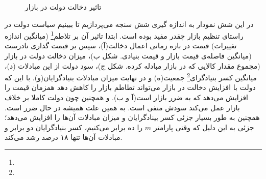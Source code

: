 \documentclass[13pt,onecolumn,a4paper]{article}
\begin{document}
\begin{figure}[H]
	\medskip
	\hfil
	\caption{تاثیر دخالت دولت در بازار}
	\label{fig:myfigure}
\end{figure}
در این شش نمودار به اندازه گیری شش سنجه می‌پردازیم تا ببینیم سیاست دولت در راستای تنظیم بازار چقدر مفید بوده است. ابتدا تاثیر آن بر تلاطم\footnote{} (میانگین اندازه تغییرات) قیمت در بازه زمانی اعمال دخالت(آ)، سپس بر قیمت گذاری نادرست (میانگین فاصله‌ی قیمت بازار و قیمت بنیادی. شکل ب)، میزان دخالت دولت در بازار (مجموع مقدار کالایی که در بازار مبادله کرده. شکل ج)، سود دولت از این مبادلات (د)، میانگین کسر بنیادگرای\footnote{} جمعیت(ه) و در نهایت میزان مبادلات بنیادگرایان(و). با این که دولت با افزایش دخالت در بازار می‌تواند تطاطم بازار را کاهش دهد همزمان قیمت را افزایش می‌دهد که به ضرر بازار است(آ و ب). و همچنین چون دولت کاملا بر خلاف بازار عمل می‌کند سودش منفی است. به همین علت همیشه در حال ضرر است. همچنین به طور بسیار جزئی کسر بینادگرایان و میزان مبادلات آن‌ها را افزایش می‌د‌هد؛ جزئی به این دلیل که وقتی پارامتر $m$ را ده برابر می‌کنیم، کسر بنیادگرایان دو برابر و مبادلات آن‌ها تنها ۱۸ درصد رشد می‌کند.
\end{document}
